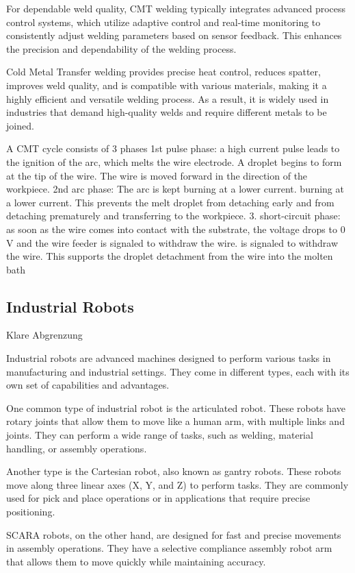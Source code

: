 For dependable weld quality, CMT welding typically integrates advanced process control systems, which utilize adaptive control and real-time monitoring to consistently adjust welding parameters based on sensor feedback. This enhances the precision and dependability of the welding process.

Cold Metal Transfer welding provides precise heat control, reduces spatter, improves weld quality, and is compatible with various materials, making it a highly efficient and versatile welding process. As a result, it is widely used in industries that demand high-quality welds and require different metals to be joined.

A CMT cycle consists of 3 phases 
1st pulse phase: a high current pulse leads to the ignition of the arc, 
which melts the wire electrode. A droplet begins to form at the 
tip of the wire. The wire is moved forward in the direction of the 
workpiece.
2nd arc phase: The arc is kept burning at a lower current. 
burning at a lower current. This prevents the melt droplet from detaching early and 
from detaching prematurely and transferring to the workpiece.
3. short-circuit phase: as soon as the wire comes into contact with the substrate, 
the voltage drops to 0 V and the wire feeder is signaled to withdraw the wire. 
is signaled to withdraw the wire. This supports the droplet detachment 
from the wire into the molten bath 

\subsection{Industrial Robots}
Klare Abgrenzung

Industrial robots are advanced machines designed to perform various tasks in manufacturing and industrial settings. They come in different types, each with its own set of capabilities and advantages.

One common type of industrial robot is the articulated robot. These robots have rotary joints that allow them to move like a human arm, with multiple links and joints. They can perform a wide range of tasks, such as welding, material handling, or assembly operations.

Another type is the Cartesian robot, also known as gantry robots. These robots move along three linear axes (X, Y, and Z) to perform tasks. They are commonly used for pick and place operations or in applications that require precise positioning.

SCARA robots, on the other hand, are designed for fast and precise movements in assembly operations. They have a selective compliance assembly robot arm that allows them to move quickly while maintaining accuracy.

